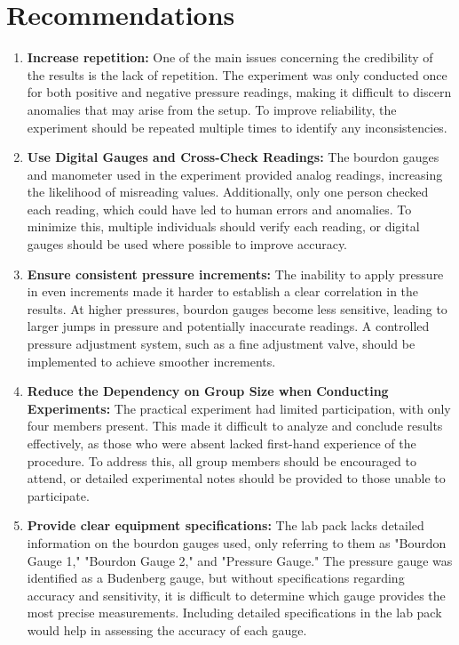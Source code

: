 \documentclass{article}
\begin{document}
	\section{Recommendations}  		
	\vspace{0.5em}
	\begin{enumerate}
		\item \textbf{Increase repetition:} One of the main issues concerning the credibility of the results is the lack of repetition. The experiment was only conducted once for both positive and negative pressure readings, making it difficult to discern anomalies that may arise from the setup. To improve reliability, the experiment should be repeated multiple times to identify any inconsistencies.  
		
		\item  \textbf{Use Digital Gauges and Cross-Check Readings:} The bourdon gauges and manometer used in the experiment provided analog readings, increasing the likelihood of misreading values. Additionally, only one person checked each reading, which could have led to human errors and anomalies. To minimize this, multiple individuals should verify each reading, or digital gauges should be used where possible to improve accuracy.  
		
		\item \textbf{Ensure consistent pressure increments:} The inability to apply pressure in even increments made it harder to establish a clear correlation in the results. At higher pressures, bourdon gauges become less sensitive, leading to larger jumps in pressure and potentially inaccurate readings. A controlled pressure adjustment system, such as a fine adjustment valve, should be implemented to achieve smoother increments.  
		
		\item \textbf{Reduce the Dependency on Group Size when Conducting Experiments:} The practical experiment had limited participation, with only four members present. This made it difficult to analyze and conclude results effectively, as those who were absent lacked first-hand experience of the procedure. To address this, all group members should be encouraged to attend, or detailed experimental notes should be provided to those unable to participate.  
		
		\item \textbf{Provide clear equipment specifications:} The lab pack lacks detailed information on the bourdon gauges used, only referring to them as "Bourdon Gauge 1," "Bourdon Gauge 2," and "Pressure Gauge." The pressure gauge was identified as a Budenberg gauge, but without specifications regarding accuracy and sensitivity, it is difficult to determine which gauge provides the most precise measurements. Including detailed specifications in the lab pack would help in assessing the accuracy of each gauge.  
	\end{enumerate}
	
\end{document}
